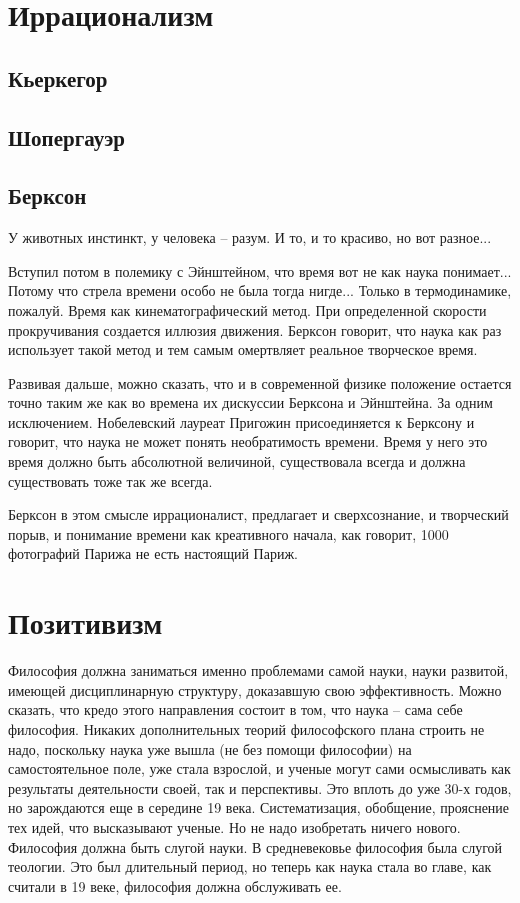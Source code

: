 \documentclass[a4paper, 12pt]{article}
\begin{document}


\section{Иррационализм}

\subsection{Кьеркегор}
\subsection{Шопергауэр}

\subsection{Берксон}

У животных инстинкт, у человека -- разум. И то, и то красиво, но вот 
разное...

Вступил потом в полемику с Эйнштейном, что время вот не как наука 
понимает... Потому что стрела времени особо не была тогда нигде... 
Только в термодинамике, пожалуй. Время как кинематографический метод. 
При определенной скорости прокручивания создается иллюзия движения. 
Берксон говорит, что наука как раз использует такой метод и тем самым 
омертвляет реальное творческое время.

Развивая дальше, можно сказать, что и в современной физике положение 
остается точно таким же как во времена их дискуссии Берксона 
и Эйнштейна. За одним исключением. Нобелевский лауреат Пригожин 
присоединяется к Берксону и говорит, что наука не может понять 
необратимость времени. Время у него это время должно быть абсолютной 
величиной, существовала всегда и должна существовать тоже так же всегда.

Берксон в этом смысле иррационалист, предлагает и сверхсознание, 
и творческий порыв, и понимание времени как креативного начала, как 
говорит, 1000 фотографий Парижа не есть настоящий Париж.

\section{Позитивизм}

Философия должна заниматься именно проблемами самой науки, науки 
развитой, имеющей дисциплинарную структуру, доказавшую свою 
эффективность. Можно сказать, что кредо этого направления состоит в том, 
что наука -- сама себе философия. Никаких дополнительных теорий 
философского плана строить не надо, поскольку наука уже вышла (не без 
помощи философии) на самостоятельное поле, уже стала взрослой, и ученые 
могут сами осмысливать как результаты деятельности своей, так 
и перспективы. Это вплоть до уже 30-х годов, но зарождаются еще 
в середине 19 века. Систематизация, обобщение, прояснение тех идей, что 
высказывают ученые. Но не надо изобретать ничего нового. Философия 
должна быть слугой науки. В средневековье философия была слугой 
теологии. Это был длительный период, но теперь как наука стала во главе, 
как считали в 19 веке, философия должна обслуживать ее.
\end{document}
